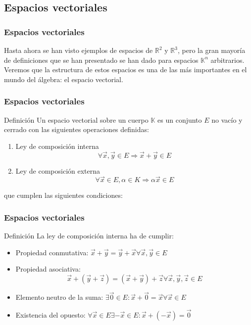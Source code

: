 \documentclass{beamer}
\begin{document}
\subsection{Espacios vectoriales}
\begin{frame}
  \frametitle{Espacios vectoriales}
  Hasta ahora se han visto ejemplos de espacios de $\mathbb R^2$ y $\mathbb R^3$, pero la gran mayor\'ia de definiciones que se han presentado se han dado para espacios $\mathbb K^n$ arbitrarios. Veremos que la estructura de estos espacios es una de las m\'as importantes en el mundo del \'algebra: el espacio vectorial.
  \end{frame}
  
  
  
  
 \begin{frame}
  \frametitle{Espacios vectoriales}
  \begin{block}{Definici\'on}
Un espacio vectorial sobre un cuerpo $\mathbb K$ es un conjunto $E$ no vac\'io y cerrado con las siguientes operaciones definidas:
\begin{enumerate}
\item Ley de composici\'on interna
\[\forall \vec x, \vec y \in E \Rightarrow \vec x + \vec y \in E\]
\item Ley de composici\'on externa
\[\forall \vec x\in E, \alpha \in K \Rightarrow \alpha \vec x \in E\]
\end{enumerate}
que cumplen las siguientes condiciones:
\end{block}
  \end{frame}
  
  
\begin{frame}
  \frametitle{Espacios vectoriales}
  \begin{block}{Definici\'on}
La ley de composici\'on interna ha de cumplir:
\begin{itemize}
\item Propiedad conmutativa:
$ \vec x + \vec y = \vec y + \vec x \forall \vec x, \vec y \in E $
\item Propiedad asociativa:
\[ \vec x + (\vec y + \vec z) = ( \vec x + \vec y) + \vec z \forall \vec x, \vec y,\vec z \in E \]
\item Elemento neutro de la suma:
$\exists \vec 0 \in E: \vec x + \vec 0 = \vec x \forall \vec x \in E $
\item Existencia del opuesto:
$\forall \vec x\in E \exists -\vec x\in E: \vec x+(-\vec x) =\vec 0 $
\end{itemize}
\end{block}
  \end{frame}
\end{document}
